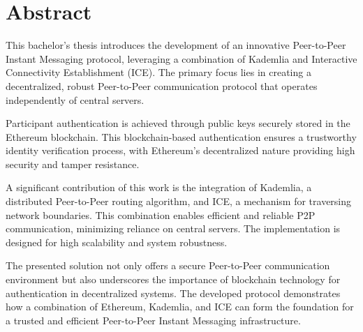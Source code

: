 \chapter*{Abstract}


This bachelor's thesis introduces the development of an innovative Peer-to-Peer Instant Messaging protocol, leveraging a combination of Kademlia and Interactive Connectivity Establishment (ICE). The primary focus lies in creating a decentralized, robust Peer-to-Peer communication protocol that operates independently of central servers.

Participant authentication is achieved through public keys securely stored in the Ethereum blockchain. This blockchain-based authentication ensures a trustworthy identity verification process, with Ethereum's decentralized nature providing high security and tamper resistance.

A significant contribution of this work is the integration of Kademlia, a distributed Peer-to-Peer routing algorithm, and ICE, a mechanism for traversing network boundaries. This combination enables efficient and reliable P2P communication, minimizing reliance on central servers. The implementation is designed for high scalability and system robustness.

The presented solution not only offers a secure Peer-to-Peer communication environment but also underscores the importance of blockchain technology for authentication in decentralized systems. The developed protocol demonstrates how a combination of Ethereum, Kademlia, and ICE can form the foundation for a trusted and efficient Peer-to-Peer Instant Messaging infrastructure.
